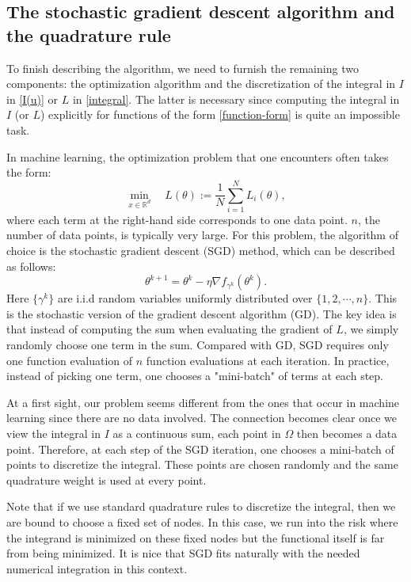 \documentclass[a4paper,12pt]{article}
\begin{document}
\subsection{The stochastic gradient descent algorithm and the quadrature rule}

To finish describing the algorithm, we need to furnish the remaining
two components:  the optimization algorithm and the discretization
of the integral in $I$ in \eqref{I(u)} or $L$ in \eqref{integral}. 
The latter is necessary since computing the integral
in $I$ (or $L$) explicitly for functions of the form 
\eqref{function-form} is quite an impossible task.

In machine learning, the optimization problem that one encounters
often takes the form:
\begin{equation}
\min_{x\in \mathbb{R}^d}\quad  L(\theta) := \frac{1}{N}\sum_{i=1}^N L_i(\theta),
\end{equation}
where each term at the right-hand side corresponds to one data point.
$n$, the number of data points, is typically very large.
For this problem, the algorithm of choice is the 
stochastic gradient descent (SGD) method, which can be 
described as follows:
\begin{equation}
\theta^{k+1} = \theta^{k} - \eta \nabla f_{\gamma^k}(\theta^k). 
\label{eq:sga_iter}
\end{equation}
Here $\{\gamma^k\}$ are i.i.d random variables uniformly distributed over $\{1,2,\cdots, n\}$.
This is the stochastic version of the gradient descent algorithm (GD).
The key idea is that instead of computing the sum when evaluating the
gradient of $L$, we simply randomly choose one term in the sum.
Compared with GD, SGD requires only one function evaluation of $n$
function evaluations at each iteration.
In practice, instead of picking one term, one chooses a "mini-batch"
of terms at each step. 

At a first sight, our problem seems different from the ones that
occur in machine learning since there are no data involved. 
The connection becomes clear once we view the integral in $I$ as
a continuous sum, each point in $\Omega$ then becomes a data point.
Therefore, at each step of the SGD iteration, one chooses
a mini-batch of points to discretize the integral.
These points are chosen randomly and the same quadrature weight is 
used at every point.

Note that if we use standard quadrature rules to discretize the integral,
then we are bound to choose a fixed set of nodes.
In this case, we run into the risk where
the integrand is minimized on these fixed nodes but the functional
itself is far from being minimized.  
It is nice that SGD fits naturally with the 
needed numerical integration in this context.
\end{document}
